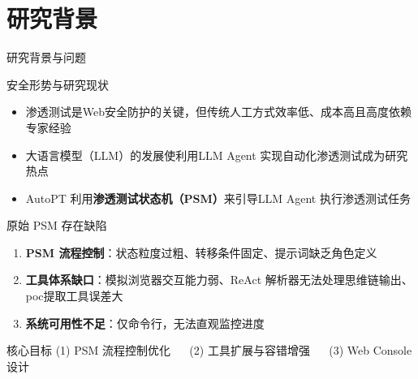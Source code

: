 \section{研究背景}

\begin{frame}{研究背景与问题}
    \scriptsize
    \begin{block}{安全形势与研究现状}
        \begin{itemize}
            \item 渗透测试是Web安全防护的关键，但传统人工方式效率低、成本高且高度依赖专家经验
            \item 大语言模型（LLM）的发展使利用LLM Agent 实现自动化渗透测试成为研究热点
            \item AutoPT\cite{Wu2024AutoPT} 利用\textbf{渗透测试状态机（PSM）}来引导LLM Agent 执行渗透测试任务
        \end{itemize}
    \end{block}

    \begin{alertblock}{原始 PSM 存在缺陷}
        \begin{enumerate}
            \item \textbf{PSM 流程控制}：状态粒度过粗、转移条件固定、提示词缺乏角色定义
            \item \textbf{工具体系缺口}：模拟浏览器交互能力弱、ReAct 解析器无法处理思维链输出、poc提取工具误差大
            \item \textbf{系统可用性不足}：仅命令行，无法直观监控进度
        \end{enumerate}
    \end{alertblock}

    \begin{exampleblock}{核心目标}
        (1) PSM 流程控制优化 $\quad$ (2) 工具扩展与容错增强 $\quad$ (3) Web Console设计
    \end{exampleblock}
\end{frame}
